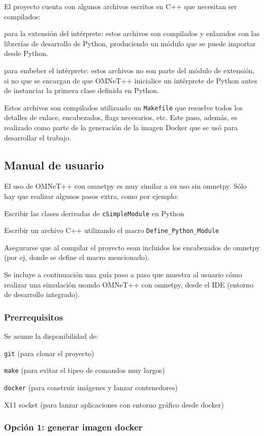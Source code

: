 \documentclass[]{article}
\begin{document}
El proyecto cuenta con algunos archivos escritos en C++ que necesitan ser
compilados:

para la extensión del intérprete: estos archivos son compilados y enlazados con
las librerías de desarrollo de Python, produciendo un módulo que se puede
importar desde Python.

para embeber el intérprete: estos archivos no son parte del módulo de
extensión, si no que se encargan de que OMNeT++ inicialice un intérprete de
Python antes de instanciar la primera clase definida en Python.

Estos archivos son compilados utilizando un \verb!Makefile! que resuelve todos
los detalles de enlace, encabezados, flags necesarios, etc. Este paso, además,
es realizado como parte de la generación de la imagen Docker que se usó para
desarrollar el trabajo.

\subsection{Manual de usuario}

El uso de OMNeT++ con omnetpy es muy similar a su uso sin omnetpy. Sólo hay que
realizar algunos pasos extra, como por ejemplo:

Escribir las clases derivadas de \verb!cSimpleModule! en Python

Escribir un archivo C++ utilizando el macro \verb!Define_Python_Module!

Asegurarse que al compilar el proyecto sean incluidos los encabezados de
omnetpy (por ej, donde se define el macro mencionado).

Se incluye a continuación una guía paso a paso que muestra al usuario cómo
realizar una simulación usando OMNeT++ con omnetpy, desde el IDE (entorno de
desarrollo integrado).

\subsubsection{Prerrequisitos}

Se asume la disponibilidad de:

\verb!git! (para clonar el proyecto)

\verb!make! (para evitar el tipeo de comandos muy largos)

\verb!docker! (para construir imágenes y lanzar contenedores)

X11 socket (para lanzar aplicaciones con entorno gráfico desde docker)

\subsubsection{Opción 1: generar imagen docker}
\end{document}
